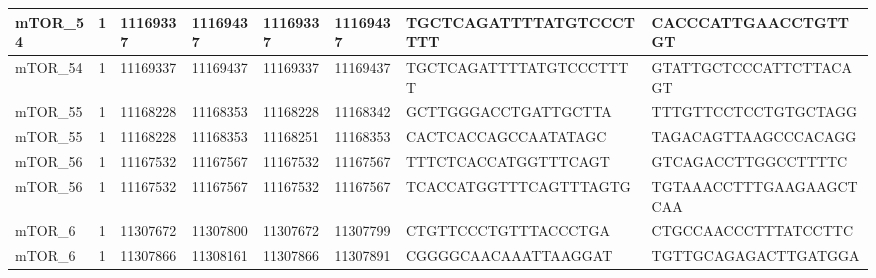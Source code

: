 \begin{landscape}
\begin{longtable}{| p{} | p{} | p{} | p{} | p{} | p{} | p{} | p{} |}
\multicolumn{1}{|l|}{mTOR\_54}   & \multicolumn{1}{c|}{1}  & \multicolumn{1}{l|}{11169337}  & \multicolumn{1}{l|}{11169437}  & \multicolumn{1}{l|}{11169337}  & \multicolumn{1}{l|}{11169437}  & \multicolumn{1}{l|}{TGCTCAGATTTTATGTCCCTTTT}         & \multicolumn{1}{l|}{CACCCATTGAACCTGTTGT}           \\ \hline
\multicolumn{1}{|l|}{mTOR\_54}   & \multicolumn{1}{c|}{1}  & \multicolumn{1}{l|}{11169337}  & \multicolumn{1}{l|}{11169437}  & \multicolumn{1}{l|}{11169337}  & \multicolumn{1}{l|}{11169437}  & \multicolumn{1}{l|}{TGCTCAGATTTTATGTCCCTTTT}         & \multicolumn{1}{l|}{GTATTGCTCCCATTCTTACAGT}        \\ \hline
\multicolumn{1}{|l|}{mTOR\_55}   & \multicolumn{1}{c|}{1}  & \multicolumn{1}{l|}{11168228}  & \multicolumn{1}{l|}{11168353}  & \multicolumn{1}{l|}{11168228}  & \multicolumn{1}{l|}{11168342}  & \multicolumn{1}{l|}{GCTTGGGACCTGATTGCTTA}            & \multicolumn{1}{l|}{TTTGTTCCTCCTGTGCTAGG}          \\ \hline
\multicolumn{1}{|l|}{mTOR\_55}   & \multicolumn{1}{c|}{1}  & \multicolumn{1}{l|}{11168228}  & \multicolumn{1}{l|}{11168353}  & \multicolumn{1}{l|}{11168251}  & \multicolumn{1}{l|}{11168353}  & \multicolumn{1}{l|}{CACTCACCAGCCAATATAGC}            & \multicolumn{1}{l|}{TAGACAGTTAAGCCCACAGG}          \\ \hline
\multicolumn{1}{|l|}{mTOR\_56}   & \multicolumn{1}{c|}{1}  & \multicolumn{1}{l|}{11167532}  & \multicolumn{1}{l|}{11167567}  & \multicolumn{1}{l|}{11167532}  & \multicolumn{1}{l|}{11167567}  & \multicolumn{1}{l|}{TTTCTCACCATGGTTTCAGT}            & \multicolumn{1}{l|}{GTCAGACCTTGGCCTTTTC}           \\ \hline
\multicolumn{1}{|l|}{mTOR\_56}   & \multicolumn{1}{c|}{1}  & \multicolumn{1}{l|}{11167532}  & \multicolumn{1}{l|}{11167567}  & \multicolumn{1}{l|}{11167532}  & \multicolumn{1}{l|}{11167567}  & \multicolumn{1}{l|}{TCACCATGGTTTCAGTTTAGTG}          & \multicolumn{1}{l|}{TGTAAACCTTTGAAGAAGCTCAA}       \\ \hline
\multicolumn{1}{|l|}{mTOR\_6}    & \multicolumn{1}{c|}{1}  & \multicolumn{1}{l|}{11307672}  & \multicolumn{1}{l|}{11307800}  & \multicolumn{1}{l|}{11307672}  & \multicolumn{1}{l|}{11307799}  & \multicolumn{1}{l|}{CTGTTCCCTGTTTACCCTGA}            & \multicolumn{1}{l|}{CTGCCAACCCTTTATCCTTC}          \\ \hline
\multicolumn{1}{|l|}{mTOR\_6}    & \multicolumn{1}{c|}{1}  & \multicolumn{1}{l|}{11307866}  & \multicolumn{1}{l|}{11308161}  & \multicolumn{1}{l|}{11307866}  & \multicolumn{1}{l|}{11307891}  & \multicolumn{1}{l|}{CGGGGCAACAAATTAAGGAT}            & \multicolumn{1}{l|}{TGTTGCAGAGACTTGATGGA}          \\ \hline

\end{longtable}
\end{landscape}
